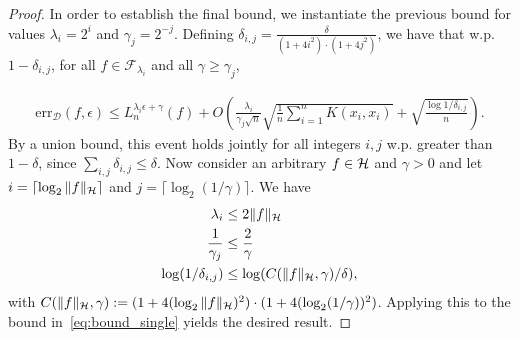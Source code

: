 \begin{proof}
In order to establish the final bound, we instantiate the previous bound for values $\lambda_i = 2^i$ and $\gamma_j = 2^{-j}$.
Defining $\delta_{i,j} = \frac{\delta}{(1 + 4i^2) \cdot ( 1 + 4j^2)}$, we have that w.p. $1 - \delta_{i,j}$, for all $f \in \mathcal F_{\lambda_i}$ and all $\gamma \geq \gamma_j$,

\begin{align}
\label{eq:bound_single}
\text{err}_\mathcal{D}(f, \epsilon) \leq L_n^{\lambda_i \epsilon + \gamma}(f) + O \left( \frac{\lambda_i}{\gamma_j \sqrt{n}} \sqrt{\frac{1}{n}\sum_{i=1}^n K(x_i, x_i)} + \sqrt{\frac{\log 1/\delta_{i,j}}{n}} \right).
\end{align}
By a union bound, this event holds jointly for all integers $i, j$ w.p. greater than $1 - \delta$,
since $\sum_{i,j} \delta_{i,j} \leq \delta$.
Now consider an arbitrary $f \in {\mathcal H}$ and $\gamma > 0$ and let $i = \lceil \log_2 \|f\|_{\mathcal H} \rceil$
and $j = \lceil \log_2 (1/\gamma) \rceil$. We have
\begin{align*}
\lambda_i &\leq 2 \|f\|_{\mathcal H} \\
\frac{1}{\gamma_j} &\leq \frac{2}{\gamma} \\
\log(1/\delta_{i,j}) &\leq \log(C(\|f\|_{\mathcal H}, \gamma) / \delta),
\end{align*}
with $C(\|f\|_{\mathcal H}, \gamma) := (1 + 4(\log_2\|f\|_{\mathcal H})^2) \cdot (1 + 4(\log_2 (1/\gamma))^2)$.
Applying this to the bound in~\eqref{eq:bound_single} yields the desired result.

\end{proof}